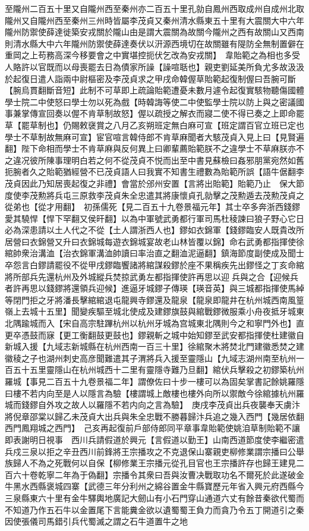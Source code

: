 至隴州二百五十里又自隴州西至秦州亦二百五十里孔勍自鳳州西取成州自成州北取隴州又自隴州西至秦州三州時皆屬李茂貞又秦州清水縣東五十里有大震關大中六年隴州防禦使薛達徙築安戎關於隴山由是謂大震關為故關今隴州之西有故關山又西南則清水縣大中六年隴州防禦使薛達奏伏以汧源西境切在故關雖有隄防全無制置僻在重岡之上苟務高深今移要會之中實堪控扼伏乞改為安戎關】　韋貽範之為相也多受人賂許以官既而以母喪罷去日為債家所譟【譟喧聒也】親吏劉延美所負尤多故汲汲於起復日遣人詣兩中尉樞密及李茂貞求之甲戌命韓偓草貽範起復制偓曰吾腕可斷【腕烏貫翻斷音短】此制不可草即上疏論貽範遭憂未數月遽令起復實駭物聽傷國體學士院二中使怒曰學士勿以死為戲【時韓誨等使二中使監學士院以防上與之密議國事兼掌傳宣回奏以偓不肯草制故怒】偓以疏授之解衣而寢二使不得已奏之上即命罷草【罷草制也】仍賜敕襃賞之八月乙亥朔班定無白麻可宣【班定謂百官立班已定也學士不草制故無麻可宣】宦官喧言韓侍郎不肯草麻聞者大駭茂貞入見上曰【見賢遍翻】陛下命相而學士不肯草麻與反何異上曰卿輩薦貽範朕不之違學士不草麻朕亦不之違况彼所陳事理明白若之何不從茂貞不悦而出至中書見蘇檢曰姦邪朋黨宛然如舊扼腕者久之貽範猶經營不已茂貞語人曰我實不知書生禮數為貽範所誤【語牛倨翻李茂貞因此乃知居喪起復之非禮】會當於邠州安置【言將出貽範】貽範乃止　保大節度使李茂勲將兵屯三原救李茂貞朱全忠遣其將康懷貞孔勍擊之茂勲遁去茂勲茂貞之從弟也【從才用翻】　初孫儒死【見二百五十九卷景福元年】其士卒多奔浙西錢鏐愛其驍悍【悍下罕翻又侯旰翻】以為中軍號武勇都行軍司馬杜稜諫曰狼子野心它日必為深患請以土人代之不從【土人謂浙西人也】鏐如衣錦軍【錢鏐臨安人既貴改所居營曰衣錦營又升曰衣錦城每遊衣錦城宴故老山林皆覆以錦】命右武勇都指揮使徐綰帥衆治溝洫【治衣錦軍溝洫帥讀曰率治直之翻洫泥逼翻】鎮海節度副使成及聞士卒怨言白鏐請罷役不從甲戌鏐臨饗諸將綰謀殺鏐於座不果稱疾先出鏐怪之丁亥命綰將所部兵先還杭州及外城縱兵焚掠武勇左都指揮使許再思以迎兵與之合【迎候兵者許再思以錢鏐將還領兵迎候】進逼牙城鏐子傳瑛【瑛音英】與三城都指揮使馬綽等閉門拒之牙將潘長擊綰綰退屯龍興寺鏐還及龍泉【龍泉即龍井在杭州城西南風篁嶺上去城十五里】聞變疾驅至城北使成及建鏐旗鼓與綰戰鏐微服乘小舟夜抵牙城東北隅踰城而入【宋自高宗駐蹕杭州以杭州牙城為宫城東北隅則今之和寧門外也】直更卒憑鼓而寐【更工衡翻鼓更鼓也】鏐親斬之城中始知鏐至武安都指揮使杜建徽自新城入援【九域志新城縣在杭州西南一百三十里】徐綰聚木將焚北門建徽悉焚之建徽稜之子也湖州刺史高彦聞難遣其子渭將兵入援至靈隱山【九域志湖州南至杭州一百五十五里靈隱山在杭州城西十二里有靈隱寺難乃旦翻】綰伏兵擊殺之初鏐築杭州羅城【事見二百五十九卷景福二年】謂僚佐曰十步一樓可以為固矣掌書記餘姚羅隱曰樓不若内向至是人以隱言為驗【樓謂城上敵樓也樓外向所以禦敵今徐綰據杭州羅城而錢鏐自外攻之故人以羅隱不若内向之言為驗】　庚戌李茂貞出兵夜襲奉天虜汴將倪章邵棠以歸乙未茂貞大出兵與朱全忠戰不勝暮歸汴兵追之幾入西門【幾居依翻西門鳳翔城之西門】　己亥再起復前戶部侍郎同平章事韋貽範使姚洎草制貽範不讓即表謝明日視事　西川兵請假道於興元【言假道以勤王】山南西道節度使李繼密遣兵戍三泉以拒之辛丑西川前鋒將王宗播攻之不克退保山寨親吏柳修業謂宗播曰公舉族歸人不為之死戰何以自保【柳修業王宗播元從孔目官也王宗播許存也歸王建見二百六十卷乾寧二年為于偽翻】宗播令其衆曰吾與汝曹决戰取功名不爾死於此遂破金牛黑水西縣褒城四寨【武德三年分利州之綿谷置金牛縣寶歷元年省入興元府西縣今三泉縣東六十里有金牛驛輿地廣記大劒山有小石門穿山通道六丈有餘昔秦欲代蜀而不知道乃作五石牛以金置尾下言能糞金欲以遺蜀蜀王負力而貪乃令五丁開道引之秦因使張儀司馬錯引兵代蜀滅之謂之石牛道置牛之地